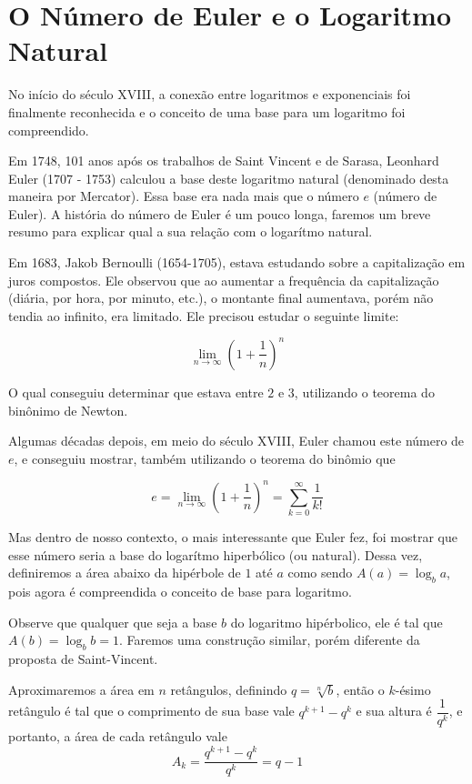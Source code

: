 \section{O Número de Euler e o Logaritmo Natural}

No início do século XVIII, a conexão entre logaritmos e exponenciais foi finalmente reconhecida e o conceito de uma base para um logaritmo foi compreendido.

Em 1748, 101 anos após os trabalhos de Saint Vincent e de Sarasa, Leonhard Euler (1707 - 1753) calculou a base deste logaritmo natural (denominado desta maneira por Mercator). Essa base era nada mais que o número $e$ (número de Euler). A história do número de Euler é um pouco longa, faremos um breve resumo para explicar qual a sua relação com o logarítmo natural.

Em 1683, Jakob Bernoulli (1654-1705), estava estudando sobre a capitalização em juros compostos. Ele observou que ao aumentar a frequência da capitalização (diária, por hora, por minuto, etc.), o montante final aumentava, porém não tendia ao infinito, era limitado. Ele precisou estudar o seguinte limite:

\[
\lim_{n \to \infty}\left(1+\frac{1}{n}\right)^n
\]

O qual conseguiu determinar que estava entre $2$ e $3$, utilizando o teorema do binônimo de Newton.

Algumas décadas depois, em meio do século XVIII, Euler chamou este número de $e$, e conseguiu mostrar, também utilizando o teorema do binômio que

\[
e = \lim_{n \to \infty}\left(1+\frac{1}{n}\right)^n = \sum_{k=0}^{\infty}\frac{1}{k!}
\]

Mas dentro de nosso contexto, o mais interessante que Euler fez, foi mostrar que esse número seria a base do logarítmo hiperbólico (ou natural). Dessa vez, definiremos a área abaixo da hipérbole de $1$ até $a$ como sendo $A(a) = \log_{b} a$, pois agora é compreendida o conceito de base para logaritmo.

Observe que qualquer que seja a base $b$ do logaritmo hipérbolico, ele é tal que $A(b) = \log_{b} b = 1$. Faremos uma construção similar, porém diferente da proposta de Saint-Vincent.

Aproximaremos a área em $n$ retângulos, definindo $q = \sqrt[n]{b}$, então o $k$-ésimo retângulo é tal que o comprimento de sua base vale $q^{k+1} - q^k$ e sua altura é $\dfrac{1}{q^k}$, e portanto, a área de cada retângulo vale
\[
    A_k = \frac{q^{k+1}-q^k}{q^k} = q - 1
\]


